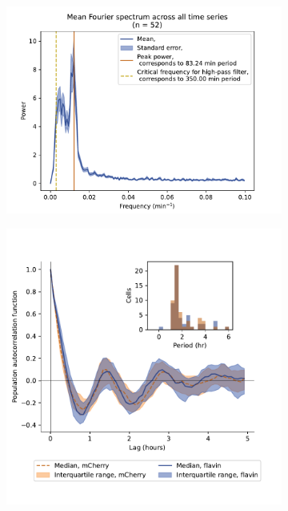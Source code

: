 \begin{figure}
  \begin{subfigure}[htpb]{0.45\textwidth}
   \centering
   \includegraphics[width=\textwidth]{htb2mCherry_27917_14}
   \caption{
   }
   \label{fig:biology-highglc-sync-fourier-2}
  \end{subfigure}%
  \begin{subfigure}[htpb]{0.45\textwidth}
   \centering
   \includegraphics[width=\textwidth]{htb2mCherry_27917_12}
   \caption{
   }
   \label{fig:biology-highglc-sync-acf-2}
  \end{subfigure}


\end{figure}
